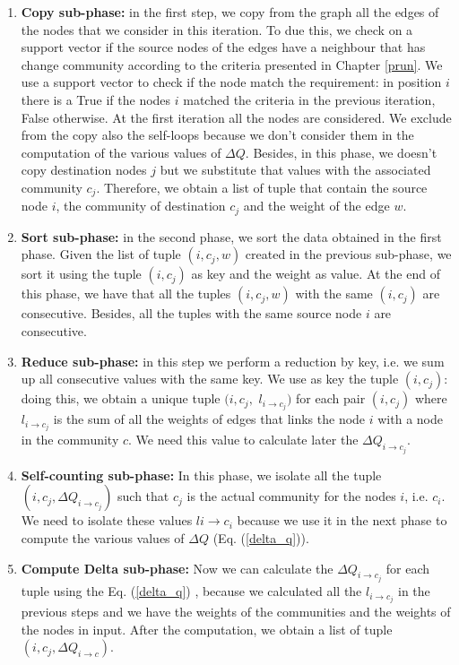 \begin{enumerate}
	\item \textbf{Copy sub-phase:} in the first step, we copy from the graph all the edges of the nodes that we consider in this iteration. To due this, we check on a support vector if the source nodes of the edges have a neighbour that has change community according to the criteria presented in Chapter \ref{prun}. We use a support vector to check if the node match the requirement: in position $i$ there is a True if the nodes $i$ matched the criteria in the previous iteration, False otherwise. At the first iteration all the nodes are considered. We exclude from the copy also the self-loops because we don't consider them in the computation of the various values of $\Delta Q$. Besides, in this phase, we doesn't copy destination nodes $j$ but we substitute that values with the associated community $c_j$. Therefore, we obtain a list of tuple that contain the source node $i$, the community of destination $c_j$ and the weight of the edge $w$.  
	
	\item \textbf{Sort sub-phase:} in the second phase, we sort the data obtained in the first phase. Given the list of tuple $(i, c_j, w)$ created in the previous sub-phase, we sort it using the tuple $(i, c_j)$ as key and the weight as value.  At the end of this phase, we have that all the tuples $(i, c_j, w)$ with the same $(i, c_j)$ are consecutive. Besides, all the tuples with the same source node $i$ are consecutive.
	
	\item \textbf{Reduce sub-phase:} in this step we perform a reduction by key, i.e. we sum up all consecutive values with the same key. We use as key the tuple $(i, c_j)$: doing this, we obtain a unique tuple $(i, c_j,$  $l_{i\rightarrow c_j})$ for each pair $(i, c_j)$ where $l_{i\rightarrow c_j}$ is the sum of all the weights of edges that links the node $i$ with a node in the community $c$. We need this value to calculate later the $\Delta Q_{i\rightarrow c_j}$.
	\item \textbf{Self-counting sub-phase:} In this phase, we isolate all the tuple  $(i, c_j, \Delta Q_{i\rightarrow c_j})$ such that 
	$c_j$ is the actual community for the nodes $i$, i.e. $c_i$. We need to isolate these values $l{i\rightarrow c_i}$ because we use it in the next phase to compute the various values of $\Delta Q$ (Eq. (\ref{delta_q})).
	
	\item \textbf{Compute Delta sub-phase:} Now we can calculate the $\Delta Q_{i\rightarrow c_j}$ for each tuple using the Eq. (\ref{delta_q}) , because we calculated all the $l_{i\rightarrow c_j}$ in the previous steps and we have the weights of the communities and the weights of the nodes in input. After the computation, we obtain a list of tuple $(i, c_j, \Delta Q_{i\rightarrow c})$.
	

\end{enumerate}
